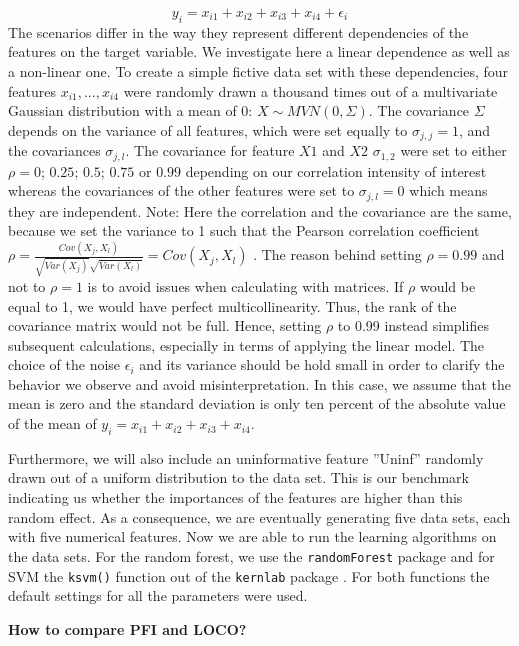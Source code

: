 \documentclass[
]{krantz}
\begin{document}
\[
y_{i} = x_{i1}+x_{i2}+x_{i3}+x_{i4}+\epsilon_{i}
\]
The scenarios differ in the way they represent different dependencies of the features on the target variable. We investigate here a linear dependence as well as a non-linear one. To create a simple fictive data set with these dependencies, four features \(x_{i1},...,x_{i4}\) were randomly drawn a thousand times out of a multivariate Gaussian distribution with a mean of 0: \(X \sim MVN(0,\Sigma)\). The covariance \(\Sigma\) depends on the variance of all features, which were set equally to \(\sigma_{j,j}=1\), and the covariances \(\sigma_{j,l}\). The covariance for feature \(X1\) and \(X2\) \(\sigma_{1,2}\) were set to either \(\rho = 0\); \(0.25\); \(0.5\); \(0.75\) or \(0.99\) depending on our correlation intensity of interest whereas the covariances of the other features were set to \(\sigma_{j,l} = 0\) which means they are independent. Note: Here the correlation and the covariance are the same, because we set the variance to 1 such that the Pearson correlation coefficient \(\rho = \frac{Cov(X_{j},X_{l})}{\sqrt{Var(X_{j})}\sqrt{Var(X_{l})}} =Cov(X_{j},X_{l})\) . The reason behind setting \(\rho = 0.99\) and not to \(\rho = 1\) is to avoid issues when calculating with matrices. If \(\rho\) would be equal to 1, we would have perfect multicollinearity. Thus, the rank of the covariance matrix would not be full. Hence, setting \(\rho\) to 0.99 instead simplifies subsequent calculations, especially in terms of
applying the linear model. The choice of the noise \(\epsilon_{i}\) and its variance should be hold small in order to clarify the behavior we observe and avoid misinterpretation. In this case, we assume that the mean is zero and the standard deviation is only ten percent of the absolute value of the mean of \(y_{i} = x_{i1}+x_{i2}+x_{i3}+x_{i4}\).

Furthermore, we will also include an uninformative feature ''Uninf'' randomly drawn out of a uniform distribution to the data set. This is our benchmark indicating us whether the importances of the features are higher than this random effect. As a consequence, we are eventually generating five data sets, each with five numerical features. Now we are able to run the learning algorithms on the data sets. For the random forest, we use the \texttt{randomForest} package \citep{R-randomForest} and for SVM the \texttt{ksvm()} function out of the \texttt{kernlab} package \citep{R-kernlab}. For both functions the default settings for all the parameters were used.

\textbf{How to compare PFI and LOCO?}
\end{document}
